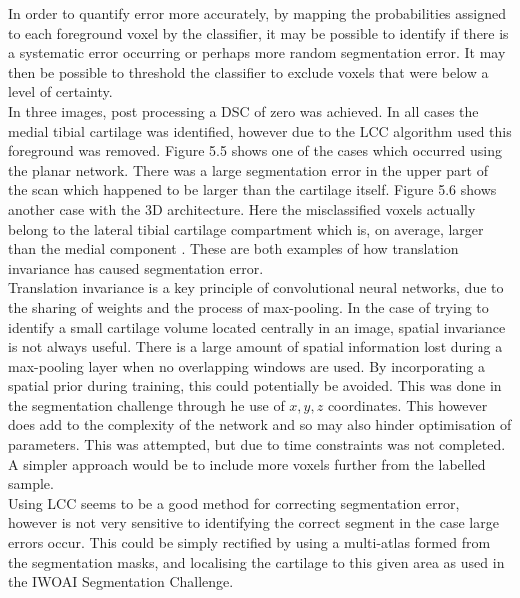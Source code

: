 \documentclass[11pt,a4paper]{memoir}
\numberwithin{figure}{section}
\numberwithin{table}{section}
\numberwithin{equation}{section}
\begin{document}
In order to quantify error more accurately, by mapping the probabilities assigned to each foreground voxel by the classifier, it may be possible to identify if there is a systematic error occurring or perhaps more random segmentation error. It may then be possible to threshold the classifier to exclude voxels that were below a level of certainty.  \\

In three images, post processing a DSC of zero was achieved. In all cases the medial tibial cartilage was identified, however due to the LCC algorithm used this foreground was removed. Figure 5.5 shows one of the cases which occurred using the planar network. There was a large segmentation error in the upper part of the scan which happened to be larger than the cartilage itself. Figure 5.6 shows another case with the 3D architecture. Here the misclassified voxels actually belong to the lateral tibial cartilage compartment which is, on average, larger than the medial component \cite{Teichtahl2012AnthropometryJoint}. These are both examples of how translation invariance has caused segmentation error. \\

Translation invariance is a key principle of convolutional neural networks, due to the sharing of weights and the process of max-pooling. In the case of trying to identify a small cartilage volume located centrally in an image, spatial invariance is not always useful. There is a large amount of spatial information lost during a max-pooling layer when no overlapping windows are used. By incorporating a spatial prior during training, this could potentially be avoided. This was done in the segmentation challenge through he use of $x, y, z$ coordinates. This however does add to the complexity of the network and so may also hinder optimisation of parameters. This was attempted, but due to time constraints was not completed. A simpler approach would be to include more voxels further from the labelled sample.  \\

Using LCC seems to be a good method for correcting segmentation error, however is not very sensitive to identifying the correct segment in the case large errors occur. This could be simply rectified by using a multi-atlas formed from the segmentation masks, and localising the cartilage to this given area as used in the IWOAI Segmentation Challenge.
\end{document}
